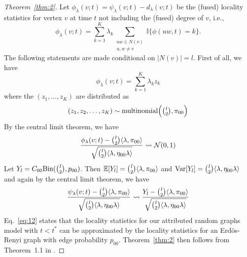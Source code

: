 \documentclass[draftcls]{IEEEtran}
\theoremstyle{definition}
\begin{document}
\begin{proof}[Theorem~\ref{thm:2}]
Let $\phi_{\lambda}(v;t) = \psi_{\lambda}(v;t) - d_{\lambda}(v;t)$ be
the (fused) locality statistics for
vertex $v$ at time $t$ not including the (fused) degree of $v$, i.e.,
\begin{equation}
  \label{eq:11}
  \phi_{\lambda}(v;t) = \sum_{k=1}^{K} \lambda_k \sum_{\substack{uw
      \in N(v) \\ u,w \not = v}}
  \mathbb{I}\{\phi(uw,t) = k\}.
\end{equation}
The following statements are made conditional on $|N(v)| = l$. First
of all, we have
\begin{equation*}
  \phi_{\lambda}(v;t) = \sum_{k=1}^{K}{\lambda_k z_k}
\end{equation*}
where the $(z_1, \dots, z_K)$ are distributed as
\begin{gather*}
  (z_1,z_2,\dots,z_K) \sim \textrm{multinomial}\Bigl(
  \tbinom{l}{2}, \pi_{00}\Bigr) 
\end{gather*}
By the central limit theorem, we have
\begin{equation*}
  \frac{\phi_\lambda(v;t) - \tbinom{l}{2} \langle \lambda, \pi_{00}
    \rangle}{\sqrt{\tbinom{l}{2} \langle \lambda, \eta_{00} \lambda \rangle}}
 \rightsquigarrow \mathcal{N}(0,1) 
\end{equation*}
Let $Y_{l} = C_{00} \mathrm{Bin}(\tbinom{l}{2}, p_{00})$. Then $\mathbb{E}[Y_l] = \tbinom{l}{2} \langle \lambda, \pi_{00} \rangle$
and $\mathrm{Var}[Y_l] = \tbinom{l}{2} \langle \lambda,
\eta_{00} \lambda \rangle$ and again by the central limit theorem, we have
\begin{equation}
  \label{eq:12}
  \frac{\psi_{\lambda}(v;t) - \tbinom{l}{2} \langle \lambda, \pi_{00}
    \rangle}{\sqrt{\tbinom{l}{2} \langle \lambda, \eta_{00} \lambda
      \rangle}} \rightsquigarrow \frac{Y_l - \tbinom{l}{2} \langle \lambda, \pi_{00} \rangle}{\sqrt{\tbinom{l}{2}
    \langle \lambda, \eta_{00} \lambda \rangle}}
\end{equation}
Eq.~\eqref{eq:12} states that the locality statistics for our
attributed random graphs model with $t < t^{*}$
can be approximated by the locality statistics for an Erd\"{o}s-Renyi
graph with edge probability $p_{00}$. Theorem~\ref{thm:2} then follows
from Theorem~1.1 in \cite{rukhin:_limit_distr_graph_scan_statis}.
\end{proof}
\end{document}
